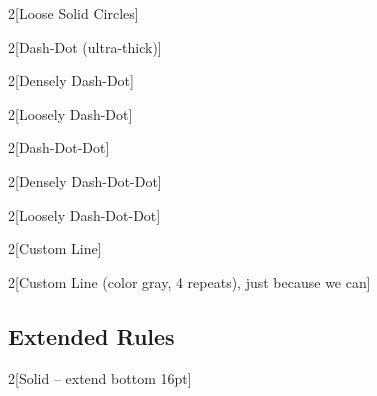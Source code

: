 \documentclass{article}
\begin{document}
\begin{multicols}{2}[Loose Solid Circles]
  \lipsum[1]
\end{multicols}

\begin{multicols}{2}[Dash-Dot (ultra-thick)]
  \lipsum[1]
\end{multicols}

\begin{multicols}{2}[Densely Dash-Dot]
  \lipsum[1]
\end{multicols}

\begin{multicols}{2}[Loosely Dash-Dot]
  \lipsum[1]
\end{multicols}

\begin{multicols}{2}[Dash-Dot-Dot]
  \lipsum[1]
\end{multicols}

\begin{multicols}{2}[Densely Dash-Dot-Dot]
  \lipsum[1]
\end{multicols}

\begin{multicols}{2}[Loosely Dash-Dot-Dot]
  \lipsum[1]
\end{multicols}

\begin{multicols}{2}[Custom Line]
  \lipsum[1-2]
\end{multicols}

\setlength{\columnsep}{50pt}
\begin{multicols}{2}[Custom Line (color gray, 4 repeats), just because we can]
  \lipsum[1-2]
\end{multicols}

\newpage
\subsection*{Extended Rules}
\setlength{\columnsep}{24pt}

\begin{multicols}{2}[Solid -- extend bottom 16pt]
  \lipsum[1]
\end{multicols}
\end{document}
